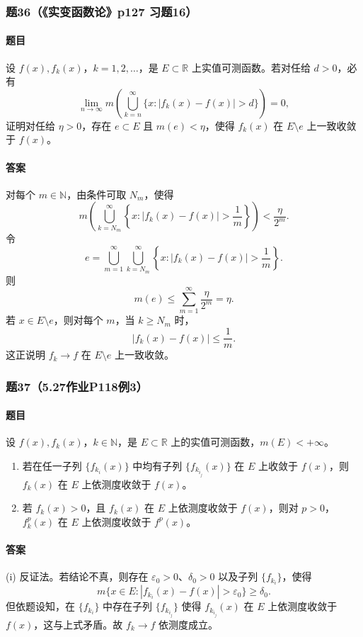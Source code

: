 \documentclass{article}
\newcommand{\R}{\mathbb{R}}
\newcommand{\N}{\mathbb{N}}
\newcommand{\eps}{\varepsilon}
\newcommand{\meas}{m}
\begin{document}
\subsubsection*{题36（《实变函数论》p127 习题16）}
\paragraph{题目}设 $f(x),f_k(x)$，$k=1,2,\ldots$，是 $E\subset\R$ 上实值可测函数。若对任给 $d>0$，必有
\[
\lim_{n\to\infty}\meas\left(\bigcup_{k=n}^{\infty}\{x:|f_k(x)-f(x)|>d\}\right)=0,
\]
证明对任给 $\eta>0$，存在 $e\subset E$ 且 $\meas(e)<\eta$，使得 $f_k(x)$ 在 $E\setminus e$ 上一致收敛于 $f(x)$。

\paragraph{答案}对每个 $m\in\N$，由条件可取 $N_m$，使得
\[
\meas\left(\bigcup_{k=N_m}^{\infty}\left\{x:|f_k(x)-f(x)|>\frac1m\right\}\right)<\frac{\eta}{2^m}.
\]
令
\[
e=\bigcup_{m=1}^{\infty}\bigcup_{k=N_m}^{\infty}\left\{x:|f_k(x)-f(x)|>\frac1m\right\}.
\]
则
\[
\meas(e)\le\sum_{m=1}^{\infty}\frac{\eta}{2^m}=\eta.
\]
若 $x\in E\setminus e$，则对每个 $m$，当 $k\ge N_m$ 时，
\[
|f_k(x)-f(x)|\le\frac1m.
\]
这正说明 $f_k\to f$ 在 $E\setminus e$ 上一致收敛。

\subsubsection*{题37（5.27作业P118例3）}
\paragraph{题目}设 $f(x),f_k(x)$，$k\in\N$，是 $E\subset\R$ 上的实值可测函数，$\meas(E)<+\infty$。
\begin{enumerate}[label=(\roman*)]
\item 若在任一子列 $\{f_{k_i}(x)\}$ 中均有子列 $\{f_{k_{i_j}}(x)\}$ 在 $E$ 上收敛于 $f(x)$，则 $f_k(x)$ 在 $E$ 上依测度收敛于 $f(x)$。
\item 若 $f_k(x)>0$，且 $f_k(x)$ 在 $E$ 上依测度收敛于 $f(x)$，则对 $p>0$，$f_k^p(x)$ 在 $E$ 上依测度收敛于 $f^p(x)$。
\end{enumerate}

\paragraph{答案}
(i) 反证法。若结论不真，则存在 $\eps_0>0$、$\delta_0>0$ 以及子列 $\{f_{k_i}\}$，使得
\[
\meas\{x\in E:|f_{k_i}(x)-f(x)|>\eps_0\}\ge\delta_0.
\]
但依题设知，在 $\{f_{k_i}\}$ 中存在子列 $\{f_{k_{i_j}}\}$ 使得 $f_{k_{i_j}}(x)$ 在 $E$ 上依测度收敛于 $f(x)$，这与上式矛盾。故 $f_k\to f$ 依测度成立。
\end{document}
